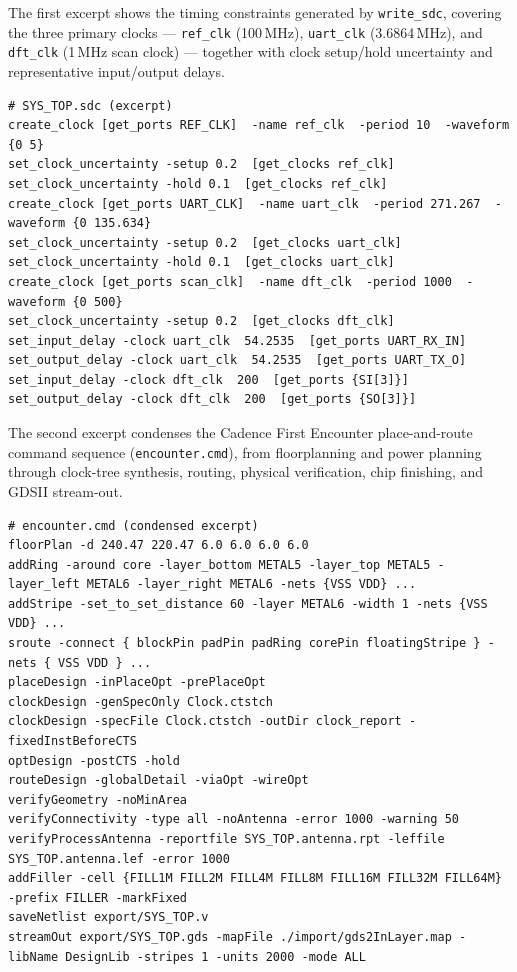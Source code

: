 \documentclass[11pt,a4paper]{article}
\begin{document}
The first excerpt shows the timing constraints generated by \texttt{write\_sdc}, covering the three primary clocks --- \texttt{ref\_clk} (100\,MHz), \texttt{uart\_clk} (3.6864\,MHz), and \texttt{dft\_clk} (1\,MHz scan clock) --- together with clock setup/hold uncertainty and representative input/output delays.

\begin{lstlisting}
# SYS_TOP.sdc (excerpt)
create_clock [get_ports REF_CLK]  -name ref_clk  -period 10  -waveform {0 5}
set_clock_uncertainty -setup 0.2  [get_clocks ref_clk]
set_clock_uncertainty -hold 0.1  [get_clocks ref_clk]
create_clock [get_ports UART_CLK]  -name uart_clk  -period 271.267  -waveform {0 135.634}
set_clock_uncertainty -setup 0.2  [get_clocks uart_clk]
set_clock_uncertainty -hold 0.1  [get_clocks uart_clk]
create_clock [get_ports scan_clk]  -name dft_clk  -period 1000  -waveform {0 500}
set_clock_uncertainty -setup 0.2  [get_clocks dft_clk]
set_input_delay -clock uart_clk  54.2535  [get_ports UART_RX_IN]
set_output_delay -clock uart_clk  54.2535  [get_ports UART_TX_O]
set_input_delay -clock dft_clk  200  [get_ports {SI[3]}]
set_output_delay -clock dft_clk  200  [get_ports {SO[3]}]
\end{lstlisting}

The second excerpt condenses the Cadence First Encounter place-and-route command sequence (\texttt{encounter.cmd}), from floorplanning and power planning through clock-tree synthesis, routing, physical verification, chip finishing, and GDSII stream-out.

\begin{lstlisting}
# encounter.cmd (condensed excerpt)
floorPlan -d 240.47 220.47 6.0 6.0 6.0 6.0
addRing -around core -layer_bottom METAL5 -layer_top METAL5 -layer_left METAL6 -layer_right METAL6 -nets {VSS VDD} ...
addStripe -set_to_set_distance 60 -layer METAL6 -width 1 -nets {VSS VDD} ...
sroute -connect { blockPin padPin padRing corePin floatingStripe } -nets { VSS VDD } ...
placeDesign -inPlaceOpt -prePlaceOpt
clockDesign -genSpecOnly Clock.ctstch
clockDesign -specFile Clock.ctstch -outDir clock_report -fixedInstBeforeCTS
optDesign -postCTS -hold
routeDesign -globalDetail -viaOpt -wireOpt
verifyGeometry -noMinArea
verifyConnectivity -type all -noAntenna -error 1000 -warning 50
verifyProcessAntenna -reportfile SYS_TOP.antenna.rpt -leffile SYS_TOP.antenna.lef -error 1000
addFiller -cell {FILL1M FILL2M FILL4M FILL8M FILL16M FILL32M FILL64M} -prefix FILLER -markFixed
saveNetlist export/SYS_TOP.v
streamOut export/SYS_TOP.gds -mapFile ./import/gds2InLayer.map -libName DesignLib -stripes 1 -units 2000 -mode ALL
\end{lstlisting}
\end{document}
